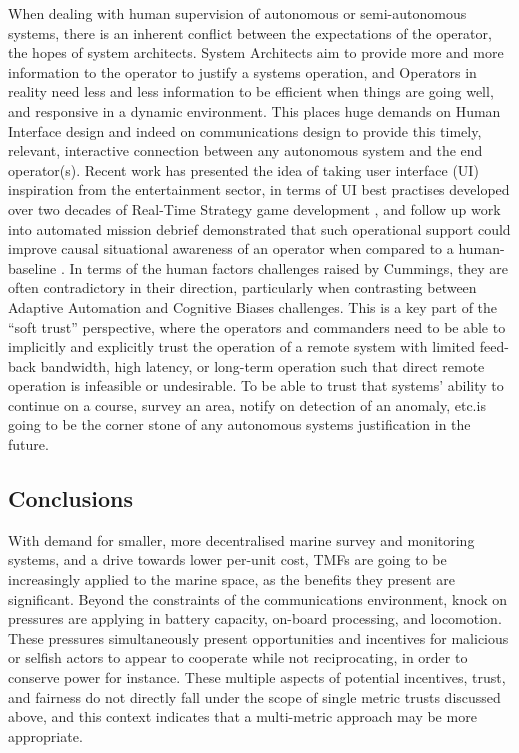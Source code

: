  When dealing with human supervision of autonomous or semi-autonomous systems, there is an inherent conflict between the expectations of the operator, the hopes of system architects.
 System Architects aim to provide more and more information to the operator to justify a systems operation, and Operators in reality need less and less information to be efficient when things are going well, and responsive in a dynamic environment.
 This places huge demands on Human Interface design and indeed on communications design to provide this timely, relevant, interactive connection between any autonomous system and the end operator(s).
 Recent work has presented the idea of taking user interface (UI) inspiration from the entertainment sector, in terms of UI best practises developed over two decades of Real-Time Strategy game development \cite{Johnson2007}, and follow up work into automated mission debrief demonstrated that such operational support could improve causal situational awareness of an operator when compared to a human-baseline \cite{Johnson2011}.
 In terms of the human factors challenges raised by Cummings, they are often contradictory in their direction, particularly when contrasting between Adaptive Automation and Cognitive Biases challenges.
 This is a key part of the ``soft trust'' perspective, where the operators and commanders need to be able to implicitly and explicitly trust the operation of a remote system with limited feed-back bandwidth, high latency, or long-term operation such that direct remote operation is infeasible or undesirable.
 To be able to trust that systems’ ability to continue on a course, survey an area, notify on detection of an anomaly, etc.is going to be the corner stone of any autonomous systems justification in the future.
 
 \subsection{Conclusions}
 With demand for smaller, more decentralised marine survey and monitoring systems, and a drive towards lower per-unit cost, TMFs are going to be increasingly applied to the marine space, as the benefits they present are significant.
 Beyond the constraints of the communications environment, knock on pressures are applying in battery capacity, on-board processing, and locomotion.
 These pressures simultaneously present opportunities and incentives for malicious or selfish actors to appear to cooperate while not reciprocating, in order to conserve power for instance.
 These multiple aspects of potential incentives, trust, and fairness do not directly fall under the scope of single metric trusts discussed above, and this context indicates that a multi-metric approach may be more appropriate.
 
